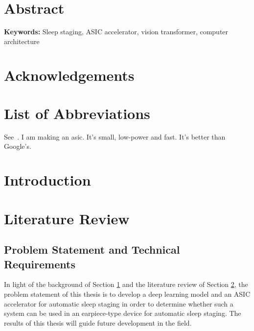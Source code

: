 \documentclass[12pt, hidelinks, draft]{article}
\begin{document}



\maketitle



\onehalfspacing


\newpage

\section*{Abstract}
    \lipsum[1]
\newline
\newline
{\bf Keywords:} Sleep staging, ASIC accelerator, vision transformer, computer architecture
\newpage

\section*{Acknowledgements}

\newpage

\tableofcontents
\newpage

\listoffigures
\newpage

\listoftables
\newpage

\section*{List of Abbreviations}

\newpage

    See~\cite{liu2021edge}.
    I am making an \ac{asic}. It's small, low-power and fast. It's better than Google's.
\section{Introduction}
\label{sec:intro}
\lipsum[1]

\newpage

\section{Literature Review}

\label{sec:lit_review}

\subsection{Problem Statement and Technical Requirements}
\label{sec:prob_statement}
In light of the background of Section \ref{sec:intro} and the literature review of Section \ref{sec:lit_review}, the problem statement of this thesis is to
develop a deep learning model and an ASIC accelerator for automatic sleep staging in order to determine whether such a system can be used in an earpiece-type
device for automatic sleep staging. The results of this thesis will guide future development in the field.
\end{document}
